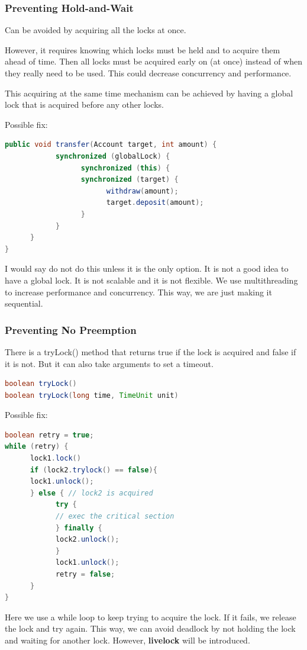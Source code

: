 \documentclass[letterpaper,12pt]{article}
\begin{document}
\subsubsection{Preventing Hold-and-Wait}
Can be avoided by acquiring all the locks at once. 

However, it requires knowing which locks must be held and to acquire them ahead of time. Then all locks must be acquired early on (at once) instead of when they really need to be used. This could decrease concurrency and performance.

This acquiring at the same time mechanism can be achieved by having a global lock that is acquired before any other locks.

Possible fix:\begin{lstlisting}[language=Java]
public void transfer(Account target, int amount) {
            synchronized (globalLock) {
                  synchronized (this) {
                  synchronized (target) {
                        withdraw(amount);
                        target.deposit(amount);
                  }
            }
      }
}
\end{lstlisting}
I would say do not do this unless it is the only option. It is not a good idea to have a global lock. It is not scalable and it is not flexible. We use multithreading to increase performance and concurrency. This way, we are just making it sequential.
\subsubsection{Preventing No Preemption}
There is a tryLock() method that returns true if the lock is acquired and false if it is not. But it can also take arguments to set a timeout.
\begin{lstlisting}[language=Java]
boolean tryLock() 
boolean tryLock(long time, TimeUnit unit) 
\end{lstlisting}
Possible fix:\begin{lstlisting}[language=Java]
boolean retry = true;
while (retry) {
      lock1.lock()
      if (lock2.trylock() == false){ 
      lock1.unlock(); 
      } else { // lock2 is acquired
            try {
            // exec the critical section
            } finally {
            lock2.unlock();
            }
            lock1.unlock();
            retry = false;
      }
}
\end{lstlisting}
Here we use a while loop to keep trying to acquire the lock. If it fails, we release the lock and try again. This way, we can avoid deadlock by not holding the lock and waiting for another lock. However, \textbf{livelock} will be introduced.
\end{document}
